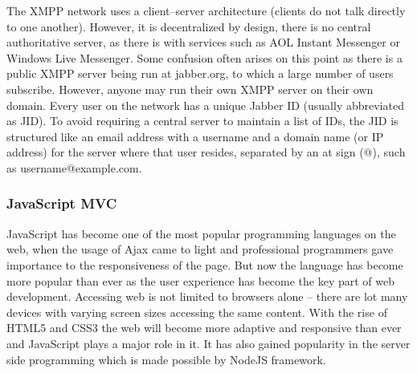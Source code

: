       The XMPP network uses a client–server architecture (clients do not talk directly to one another). However, it is decentralized by design, there is no central authoritative server, as there is with services such as AOL Instant Messenger or Windows Live Messenger. Some confusion often arises on this point as there is a public XMPP server being run at jabber.org, to which a large number of users subscribe. However, anyone may run their own XMPP server on their own domain. Every user on the network has a unique Jabber ID (usually abbreviated as JID). To avoid requiring a central server to maintain a list of IDs, the JID is structured like an email address with a username and a domain name (or IP address) for the server where that user resides, separated by an at sign (@), such as username@example.com.

  \subsubsection{JavaScript MVC}
    JavaScript has become one of the most popular programming languages on the web, when the usage of Ajax came to light and professional programmers gave importance to the responsiveness of the page. But now the language has become more popular than ever as the user experience has become the key part of web development. Accessing web is not limited to browsers alone – there are lot many devices with varying screen sizes accessing the same content. With the rise of HTML5 and CSS3 the web will become more adaptive and responsive than ever and JavaScript plays a major role in it. It has also gained popularity in the server side programming which is made possible by NodeJS framework.

